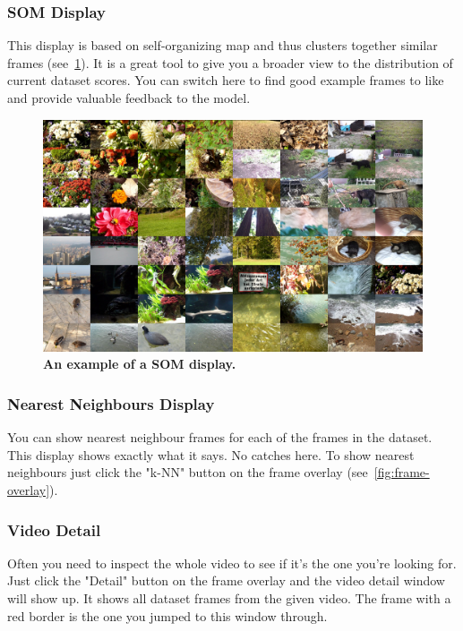 \pagebreak
\subsubsection{SOM Display}
This display is based on self-organizing map and thus clusters together similar frames (see~\cref{fig:som-display}). It is a great tool to give you a broader view to the distribution of current dataset scores. You can switch here to find good example frames to like and provide valuable feedback to the model.

\begin{figure}[h]
	\centering
	\includegraphics[width=1.0\textwidth]{img/som-display.png}
  \caption{\textbf{An example of a SOM display.}}
	\label{fig:som-display}
\end{figure}

\subsubsection{Nearest Neighbours Display}
You can show nearest neighbour frames for each of the frames in the dataset. This display shows exactly what it says. No catches here. To show nearest neighbours just click the "k-NN" button on the frame overlay (see~\cref{fig:frame-overlay}).

\pagebreak
\subsubsection{Video Detail}
Often you need to inspect the whole video to see if it's the one you're looking for. Just click the "Detail" button on the frame overlay and the video detail window will show up. It shows all dataset frames from the given video. The frame with a red border is the one you jumped to this window through.

